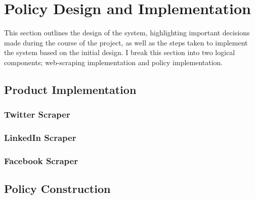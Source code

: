 \chapter{Policy Design and Implementation}\label{C:us}

This section outlines the design of the system, highlighting important decisions made during the course of the project, as well as the steps taken to implement the system based on the initial design. I break this section into two logical components; web-scraping implementation and policy implementation.

\section{Product Implementation}




\subsection{Twitter Scraper}


\subsection{LinkedIn Scraper}

\subsection{Facebook Scraper}








\section{Policy Construction}

